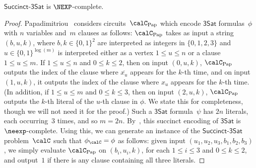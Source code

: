 \documentclass[11pt]{article}
\newcommand{\succinct}{\mathsf{Succinct}\text{-}\mathsf{3Sat}}
\begin{document}
\begin{proposition}
$\succinct$ is $\NEXP$-complete.
\end{proposition}
\begin{proof}
Papadimitriou~\cite{Pap94}
considers circuits~$\calC_{\mathrm{Pap}}$ which encode $\mathsf{3Sat}$ formulas~$\phi$ with $n$ variables and~$m$ clauses
as follows:
$\calC_{\mathrm{Pap}}$ takes as input a string $(b, u, k)$, where $b, k \in \{0, 1\}^2$ are interpreted as integers in $\{0, 1, 2, 3\}$
and $u \in \{0, 1\}^{\log(m)}$ is interpreted either as a vertex $1 \leq u \leq n$ or a clause $1 \leq u \leq m$.
If $1 \leq u \leq n$ and $0 \leq k \leq 2$, 
then on input $(0, u, k)$, $\calC_{\mathrm{Pap}}$ outputs the index of the clause where $\overline{x_u}$ appears for the $k$-th time,
and on input $(1, u, k)$,  it outputs the index of the clause where $x_u$ appears for the $k$-th time.
(In addition, if $1 \leq u \leq m$ and $0 \leq k \leq 3$, then on input $(2, u, k)$,
$\calC_{\mathrm{Pap}}$ outputs the $k$-th literal of the $u$-th clause in $\phi$.
We state this for completeness, though we will not need it for the proof.)
Such a $\mathsf{3Sat}$ formula~$\psi$ has $2n$ literals, each occurring~$3$ times, and so $m = 2n$.
By~\cite[Chapter 20]{Pap94}, this succinct encoding of $\mathsf{3Sat}$ is $\neexp$-complete.
Using this, we can generate an instance of the $\succinct$ problem~$\calC$ such that $\phi_\calC = \phi$ as follows:
given input $(u_1, u_2, u_3, b_1, b_2, b_3)$, we simply evaluate $\calC_{\mathrm{Pap}}$ on $(b_i, u_i, k)$, for each $1 \leq i \leq 3$ and $0 \leq k \leq 2$, and output~$1$ if there is any clause containing all three literals.
\end{proof}
\end{document}
